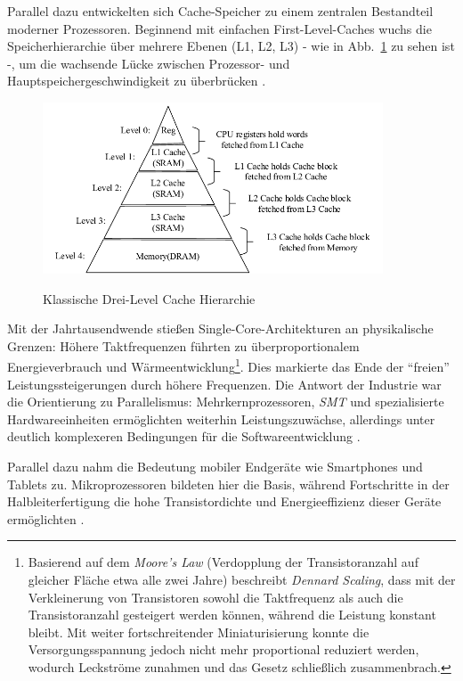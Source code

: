Parallel dazu entwickelten sich Cache-Speicher zu einem zentralen Bestandteil moderner Prozessoren. Beginnend mit einfachen First-Level-Caches wuchs die Speicherhierarchie über mehrere Ebenen (L1, L2, L3) - wie in Abb.~\ref{fig:cache_hierarchie} zu sehen ist -, um die wachsende Lücke zwischen Prozessor- und Hauptspeichergeschwindigkeit zu überbrücken \parencite[S.~2]{hennessy_computer_2011}.

\begin{figure}[htbp]
    \centering
    \includegraphics[width=0.90\textwidth]{img/Cache-Hierarchie.png}
    \caption{Klassische Drei-Level Cache Hierarchie}
	\cite{gao_cspm_2022}
    \label{fig:cache_hierarchie}
\end{figure}

Mit der Jahrtausendwende stießen Single-Core-Architekturen an physikalische Grenzen: Höhere Taktfrequenzen führten zu überproportionalem Energieverbrauch und Wärmeentwicklung\footnote{Basierend auf dem \textit{Moore’s Law} (Verdopplung der Transistoranzahl auf gleicher Fläche etwa alle zwei Jahre) beschreibt \textit{Dennard Scaling}, dass mit der Verkleinerung von Transistoren sowohl die Taktfrequenz als auch die Transistoranzahl gesteigert werden können, während die Leistung konstant bleibt. Mit weiter fortschreitender Miniaturisierung konnte die Versorgungsspannung jedoch nicht mehr proportional reduziert werden, wodurch Leckströme zunahmen und das Gesetz schließlich zusammenbrach.}. Dies markierte das Ende der \enquote{freien} Leistungssteigerungen durch höhere Frequenzen. Die Antwort der Industrie war die Orientierung zu Parallelismus: Mehrkernprozessoren, \textit{\ac{SMT}} und spezialisierte Hardwareeinheiten ermöglichten weiterhin Leistungszuwächse, allerdings unter deutlich komplexeren Bedingungen für die Softwareentwicklung \parencites[S.~3f]{shalf_new_2007}[S.~67f]{parkhurst_single_2006}.

Parallel dazu nahm die Bedeutung mobiler Endgeräte wie Smartphones und Tablets zu. Mikroprozessoren bildeten hier die Basis, während Fortschritte in der Halbleiterfertigung die hohe Transistordichte und Energieeffizienz dieser Geräte ermöglichten \parencite[S.~2]{hennessy_computer_2011}.

